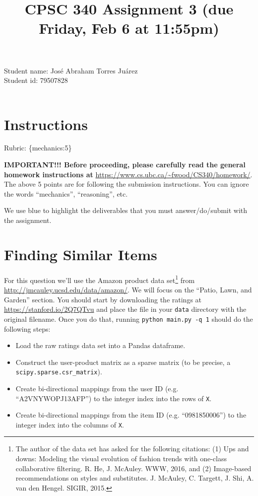 \documentclass{article}
\def\rubric#1{\gre{Rubric: \{#1\}}}{}
\def\blu#1{{\color{blu}#1}}
\def\gre#1{{\color{gre}#1}}
\def\ans#1{{\color{ans}#1}}
\begin{document}
\title{CPSC 340 Assignment 3 (due Friday, Feb 6 at 11:55pm)}
\date{}
\maketitle

\vspace{-4em}
\ans{
    Student name: José Abraham Torres Juárez \\
    Student id: 79507828 \\ \\
}
\section*{Instructions}
\rubric{mechanics:5}

\textbf{IMPORTANT!!! Before proceeding, please carefully read the general homework instructions at} \url{https://www.cs.ubc.ca/~fwood/CS340/homework/}. The above 5 points are for following the submission instructions. You can ignore the words ``mechanics'', ``reasoning'', etc.

\vspace{1em}
We use \blu{blue} to highlight the deliverables that you must answer/do/submit with the assignment.


\section{Finding Similar Items}

For this question we'll use the Amazon product data set\footnote{The author of the data set has asked for the following citations: (1) Ups and downs: Modeling the visual evolution of fashion trends with one-class collaborative filtering. R. He, J. McAuley. WWW, 2016, and (2) Image-based recommendations on styles and substitutes. J. McAuley, C. Targett, J. Shi, A. van den Hengel. SIGIR, 2015.} from \url{http://jmcauley.ucsd.edu/data/amazon/}. We will focus on the ``Patio, Lawn, and Garden'' section. You should start by downloading the ratings at \\
\url{https://stanford.io/2Q7QTvu} and place the file in your \texttt{data} directory with the original filename. Once you do that, running \texttt{python main.py -q 1} should do the following steps:

\begin{itemize}
\item Load the raw ratings data set into a Pandas dataframe.
\item Construct the user-product matrix as a sparse matrix (to be precise, a \verb|scipy.sparse.csr_matrix|).
\item Create bi-directional mappings from the user ID (e.g. ``A2VNYWOPJ13AFP'') to the integer index into the rows of \texttt{X}.
\item Create bi-directional mappings from the item ID (e.g. ``0981850006'') to the integer index into the columns of \texttt{X}.
\end{itemize}
\end{document}
